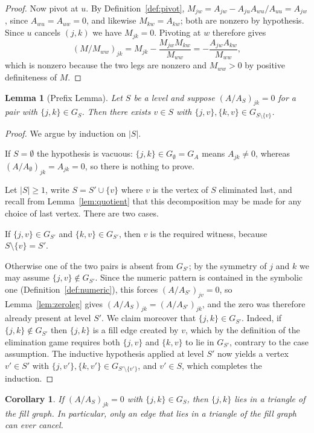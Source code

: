 \documentclass[11pt]{article}
\theoremstyle{plain}
\newtheorem{lemma}[theorem]{Lemma}
\newtheorem{corollary}[theorem]{Corollary}
\theoremstyle{definition}
\begin{document}
\begin{aiblock}
\begin{proof}
Now pivot at $u$. By Definition~\ref{def:pivot},
$M_{jw}=A_{jw}-A_{ju}A_{wu}/A_{uu}=A_{jw}$, since $A_{wu}=A_{uw}=0$, and likewise $M_{kw}=A_{kw}$;
both are nonzero by hypothesis. Since $u$ cancels $(j,k)$ we have $M_{jk}=0$. Pivoting at $w$
therefore gives
\[
  (M/M_{ww})_{jk}=M_{jk}-\frac{M_{jw}M_{kw}}{M_{ww}}=-\frac{A_{jw}A_{kw}}{M_{ww}},
\]
which is nonzero because the two legs are nonzero and $M_{ww}>0$ by positive definiteness of $M$.
\end{proof}

\begin{lemma}[Prefix Lemma]\label{lem:prefix}
Let $S$ be a level and suppose $(A/A_S)_{jk}=0$ for a pair with $\{j,k\}\in G_S$. Then there exists
$v\in S$ with $\{j,v\},\{k,v\}\in G_{S\setminus\{v\}}$.
\end{lemma}

\begin{proof}
We argue by induction on $|S|$.

If $S=\emptyset$ the hypothesis is vacuous: $\{j,k\}\in G_\emptyset=G_A$ means $A_{jk}\neq0$, whereas
$(A/A_\emptyset)_{jk}=A_{jk}=0$, so there is nothing to prove.

Let $|S|\ge1$, write $S=S'\cup\{v\}$ where $v$ is the vertex of $S$ eliminated last, and recall from
Lemma~\ref{lem:quotient} that this decomposition may be made for any choice of last vertex. There are
two cases.

If $\{j,v\}\in G_{S'}$ and $\{k,v\}\in G_{S'}$, then $v$ is the required witness, because
$S\setminus\{v\}=S'$.

Otherwise one of the two pairs is absent from $G_{S'}$; by the symmetry of $j$ and $k$ we may assume
$\{j,v\}\notin G_{S'}$. Since the numeric pattern is contained in the symbolic one
(Definition~\ref{def:numeric}), this forces $(A/A_{S'})_{jv}=0$, so Lemma~\ref{lem:zeroleg} gives
$(A/A_S)_{jk}=(A/A_{S'})_{jk}$, and the zero was therefore already present at level $S'$. We claim
moreover that $\{j,k\}\in G_{S'}$. Indeed, if $\{j,k\}\notin G_{S'}$ then $\{j,k\}$ is a fill edge
created by $v$, which by the definition of the elimination game requires both $\{j,v\}$ and $\{k,v\}$
to lie in $G_{S'}$, contrary to the case assumption. The inductive hypothesis applied at level $S'$
now yields a vertex $v'\in S'$ with $\{j,v'\},\{k,v'\}\in G_{S'\setminus\{v'\}}$, and $v'\in S$, which
completes the induction.
\end{proof}

\begin{corollary}\label{cor:tri-nec}
If $(A/A_S)_{jk}=0$ with $\{j,k\}\in G_S$, then $\{j,k\}$ lies in a triangle of the fill graph. In
particular, only an edge that lies in a triangle of the fill graph can ever cancel.
\end{corollary}


\end{aiblock}
\end{document}
